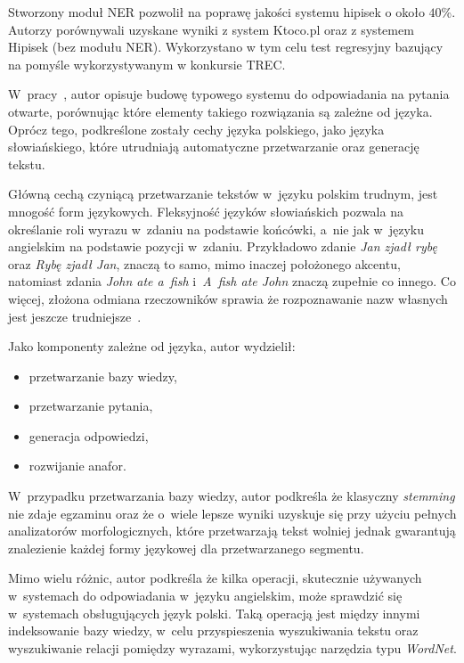 Stworzony moduł NER pozwolił na poprawę jakości systemu hipisek o około $40$\%. Autorzy porównywali uzyskane wyniki z system Ktoco.pl oraz z systemem Hipisek (bez modułu NER). Wykorzystano w tym celu test regresyjny bazujący na pomyśle wykorzystywanym w konkursie TREC.

W~pracy~\cite{przybyla2012issues}, autor opisuje budowę typowego systemu do odpowiadania na pytania otwarte, porównując które elementy takiego rozwiązania są zależne od języka. Oprócz tego, podkreślone zostały cechy języka polskiego, jako języka słowiańskiego, które utrudniają automatyczne przetwarzanie oraz generację tekstu.

Główną cechą czyniącą przetwarzanie tekstów w~języku polskim trudnym, jest mnogość form językowych. Fleksyjność języków słowiańskich pozwala na określanie roli wyrazu w~zdaniu na podstawie końcówki, a~nie jak w~języku angielskim na podstawie pozycji w~zdaniu. Przykładowo zdanie \emph{Jan zjadł rybę} oraz \emph{Rybę zjadł Jan}, znaczą to samo, mimo inaczej położonego akcentu, natomiast zdania \emph{John ate a~fish} i~\emph{A~fish ate John} znaczą zupełnie co innego. Co więcej, złożona odmiana rzeczowników sprawia że rozpoznawanie nazw własnych jest jeszcze trudniejsze~\cite{przybyla2012issues}.

Jako komponenty zależne od języka, autor wydzielił:
\begin{itemize}
	\item przetwarzanie bazy wiedzy,
	\item przetwarzanie pytania,
	\item generacja odpowiedzi,
	\item rozwijanie anafor.
\end{itemize}

W~przypadku przetwarzania bazy wiedzy, autor podkreśla że klasyczny \emph{stemming} nie zdaje egzaminu oraz że o~wiele lepsze wyniki uzyskuje się przy użyciu pełnych analizatorów morfologicznych, które przetwarzają tekst wolniej jednak gwarantują znalezienie każdej formy językowej dla przetwarzanego segmentu.

Mimo wielu różnic, autor podkreśla że kilka operacji, skutecznie używanych w~systemach do odpowiadania w~języku angielskim, może sprawdzić się w~systemach obsługujących język polski. Taką operacją jest między innymi indeksowanie bazy wiedzy, w~celu przyspieszenia wyszukiwania tekstu oraz wyszukiwanie relacji pomiędzy wyrazami, wykorzystując narzędzia typu \emph{WordNet}.

